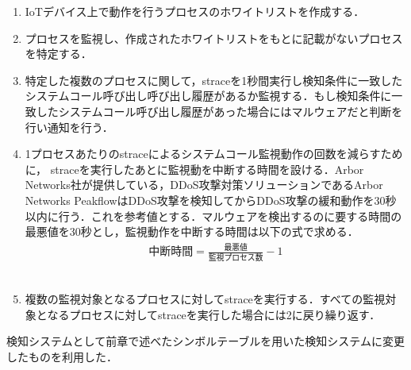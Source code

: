 \begin{enumerate}
 \item IoTデバイス上で動作を行うプロセスのホワイトリストを作成する．
 \item プロセスを監視し、作成されたホワイトリストをもとに記載がないプロセスを特定する．
 \item 特定した複数のプロセスに関して，straceを1秒間実行し検知条件に一致したシステムコール呼び出し呼び出し履歴があるか監視する．もし検知条件に一致したシステムコール呼び出し履歴があった場合にはマルウェアだと判断を行い通知を行う．
 
 \item 1プロセスあたりのstraceによるシステムコール監視動作の回数を減らすために，
 straceを実行したあとに監視動を中断する時間を設ける．Arbor Networks社が提供している，DDoS攻撃対策ソリューションであるArbor Networks PeakflowはDDoS攻撃を検知してからDDoS攻撃の緩和動作を30秒以内に行う．これを参考値とする．マルウェアを検出するのに要する時間の最悪値を30秒とし，監視動作を中断する時間は以下の式で求める．
 \begin{eqnarray}
 中断時間  =  \frac{最悪値}{監視プロセス数}-1
 \end{eqnarray}
　\item 複数の監視対象となるプロセスに対してstraceを実行する．すべての監視対象となるプロセスに対してstraceを実行した場合には2に戻り繰り返す．
 \end{enumerate}
 
 検知システムとして前章で述べたシンボルテーブルを用いた検知システムに変更したものを利用した．


 
 

